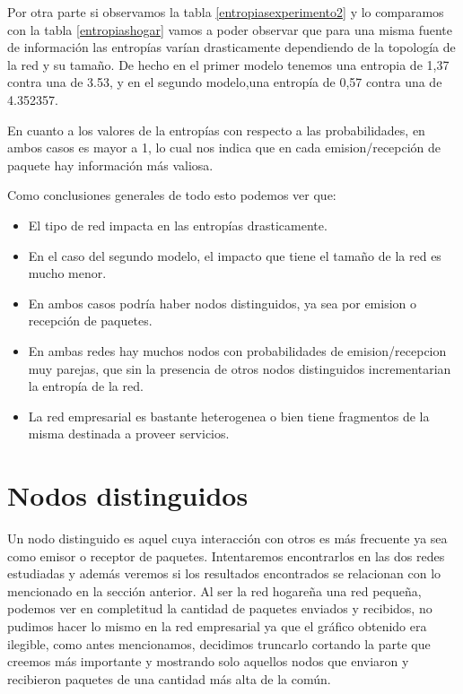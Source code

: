 Por otra parte si observamos la tabla \ref{entropiasexperimento2} y lo comparamos con la tabla \ref{entropiashogar} vamos a poder 
observar que para una misma fuente de información las entropías varían drasticamente dependiendo de la topología de la red y su tamaño.
De hecho en el primer modelo tenemos una entropia de 1,37 contra una de 3.53, y en el segundo modelo,una entropía de 0,57 contra una
de 4.352357.

En cuanto a los valores de la entropías con respecto a las probabilidades, en ambos casos es mayor a 1, lo cual nos indica que
en cada emision/recepción de paquete hay información más valiosa.




Como conclusiones generales de todo esto podemos ver que:
\begin{itemize}
 \item El tipo de red impacta en las entropías drasticamente.
 \item En el caso del segundo modelo, el impacto que tiene el tamaño de la red es mucho menor. 
 \item En ambos casos podría haber nodos distinguidos, ya sea por emision o recepción de paquetes.
\item En ambas redes hay muchos nodos con probabilidades de emision/recepcion muy parejas, que sin la presencia de otros nodos distinguidos
  incrementarian la entropía de la red. 
\item La red empresarial es bastante heterogenea o bien tiene fragmentos de la misma destinada a proveer servicios.
\end{itemize}


\section{Nodos distinguidos}
Un nodo distinguido es aquel cuya interacción con otros es más frecuente  ya sea como emisor o receptor de paquetes.
Intentaremos encontrarlos en las dos redes estudiadas y además veremos si los resultados encontrados se relacionan con lo mencionado en
la sección anterior.
Al ser la red hogareña una red pequeña, podemos ver en completitud la cantidad de paquetes enviados y recibidos,
no pudimos hacer lo mismo en la red empresarial ya que el gráfico obtenido era ilegible, como antes mencionamos, decidimos truncarlo cortando la parte que creemos
más importante y mostrando solo aquellos nodos que enviaron y recibieron paquetes de una cantidad más alta de la común.

